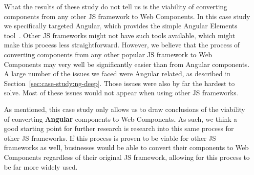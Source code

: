 What the results of these study do not tell us is the viability of converting components from any other JS framework to Web Components. In this case study we specifically targeted Angular, which provides the simple Angular Elements tool~. Other JS frameworks might not have such tools available, which might make this process less straightforward. However, we believe that the process of converting components from any other popular JS framework to Web Components may very well be significantly easier than from Angular components. A large number of the issues we faced were Angular related, as described in Section~\ref{sec:case-study:ng-deep}. Those issues were also by far the hardest to solve. Most of these issues would not appear when using other JS frameworks.

As mentioned, this case study only allows us to draw conclusions of the viability of converting \textbf{Angular} components to Web Components. As such, we think a good starting point for further research is research into this same process for other JS frameworks. If this process is proven to be viable for other JS frameworks as well, businesses would be able to convert their components to Web Components regardless of their original JS framework, allowing for this process to be far more widely used.